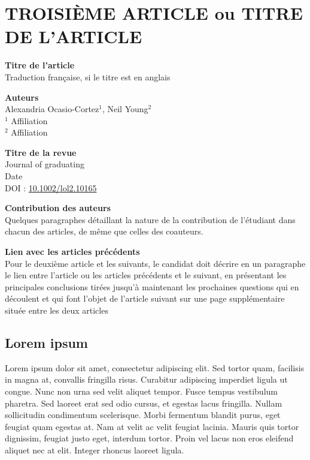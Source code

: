 \chapter{TROISIÈME ARTICLE ou TITRE DE L’ARTICLE}

{\setlength{\parindent}{0cm}
\textbf{Titre de l'article} %
\\ Traduction française, si le titre est en anglais

\textbf{Auteurs}
\\Alexandria Ocasio-Cortez$^1$, Neil Young$^2$
\\$^1$ Affiliation
\\$^2$ Affiliation

\textbf{Titre de la revue}
\\ Journal of graduating %
\\ Date %
\\ DOI : \url{10.1002/lol2.10165} %

\textbf{Contribution des auteurs\\}
Quelques paragraphes détaillant la nature de la contribution de l’étudiant dans chacun des articles, de même que celles des coauteurs.

\textbf{Lien avec les articles précédents\\}
Pour le deuxième article et les suivants, le candidat doit décrire en un paragraphe le lien entre l’article ou les articles précédents et le suivant, en présentant les principales conclusions tirées jusqu'à maintenant les prochaines questions qui en découlent et qui font l’objet de l’article suivant sur une page supplémentaire située entre les deux articles

\newpage
\section{Lorem ipsum}
Lorem ipsum dolor sit amet, consectetur adipiscing elit. Sed tortor quam, facilisis in magna at, convallis fringilla risus. Curabitur adipiscing imperdiet ligula ut congue. Nunc non urna sed velit aliquet tempor. Fusce tempus vestibulum pharetra. Sed laoreet erat sed odio cursus, et egestas lacus fringilla. Nullam sollicitudin condimentum scelerisque. Morbi fermentum blandit purus, eget feugiat quam egestas at. Nam at velit ac velit feugiat lacinia. Mauris quis tortor dignissim, feugiat justo eget, interdum tortor. Proin vel lacus non eros eleifend aliquet nec at elit. Integer rhoncus laoreet ligula.

}
